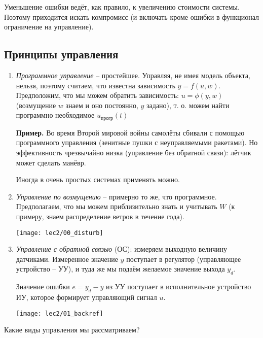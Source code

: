 \documentclass[main.tex]{subfiles}
\begin{document}
Уменьшение ошибки ведёт, как правило, к увеличению стоимости системы.
Поэтому приходится искать компромисс (и включать кроме ошибки в функционал ограничение на управление).

\subsection{Принципы управления}

\begin{enumerate}[noitemsep]
	\item \emph{Программное управление} -- простейшее. Управляя, не имея модель объекта, нельзя, поэтому считаем, что известна зависимость $ y = f(u, w) $. Предположим, что мы можем обратить зависимость: $ u = \phi(y, w) $ (возмущение $ w $ знаем и оно постоянно, $ y $ задано), т. о. можем найти программно необходимое $ u_{\text{прогр}}(t) $

	\textbf{Пример.}
	Во время Второй мировой войны самолёты сбивали с помощью программного управления (зенитные пушки с неуправляемыми ракетами).
	Но эффективность чрезвычайно низка (управление без обратной связи): лётчик может сделать манёвр.

	Иногда в очень простых системах применять можно.
	\item \emph{Управление по возмущению} -- примерно то же, что программное.
	Предполагаем, что мы можем приблизительно знать и учитывать $ W $ (к примеру, знаем распределение ветров в течение года).

    \texttt{[image: lec2/00\_disturb]}

	\item \emph{Управление с обратной связью} (ОС): измеряем выходную величину датчиками. Измеренное значение $ y $ поступает в регулятор (управляющее устройство -- УУ), и туда же мы подаём желаемое значение выхода $ y_d $.

    Значение ошибки $ e = y_d - y $ из УУ поступает в исполнительное устройство ИУ, которое формирует управляющий сигнал $ u $.

    \texttt{[image: lec2/01\_backref]}
\end{enumerate}

Какие виды управления мы рассматриваем?
\end{document}
